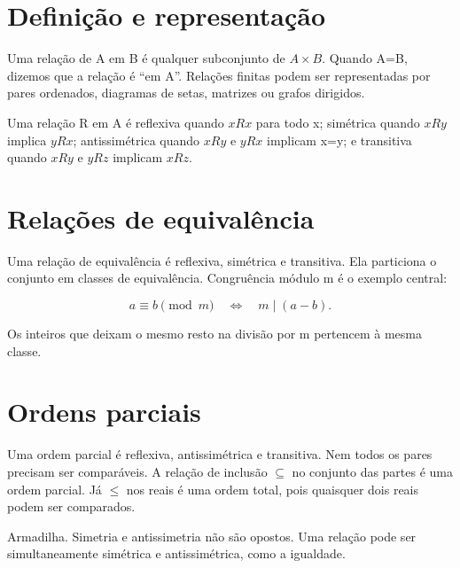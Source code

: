 \documentclass[12pt,a4paper,openany]{book}
\begin{document}
\section{Definição e representação}



Uma relação de A em B é qualquer subconjunto de $A\times B$. Quando A=B, dizemos que a relação é “em A”. Relações finitas podem ser representadas por pares ordenados, diagramas de setas, matrizes ou grafos dirigidos.



Uma relação R em A é reflexiva quando $xRx$ para todo x; simétrica quando $xRy$ implica $yRx$; antissimétrica quando $xRy$ e $yRx$ implicam x=y; e transitiva quando $xRy$ e $yRz$ implicam $xRz$.



\section{Relações de equivalência}



Uma relação de equivalência é reflexiva, simétrica e transitiva. Ela particiona o conjunto em classes de equivalência. Congruência módulo m é o exemplo central:



\[a\equiv b\pmod m \quad\Longleftrightarrow\quad m\mid(a-b).\]



Os inteiros que deixam o mesmo resto na divisão por m pertencem à mesma classe.



\section{Ordens parciais}



Uma ordem parcial é reflexiva, antissimétrica e transitiva. Nem todos os pares precisam ser comparáveis. A relação de inclusão $\subseteq$ no conjunto das partes é uma ordem parcial. Já $\leq$ nos reais é uma ordem total, pois quaisquer dois reais podem ser comparados.



\begin{exemplo}{Armadilha.}
Simetria e antissimetria não são opostos. Uma relação pode ser simultaneamente simétrica e antissimétrica, como a igualdade.
\end{exemplo}
\end{document}
